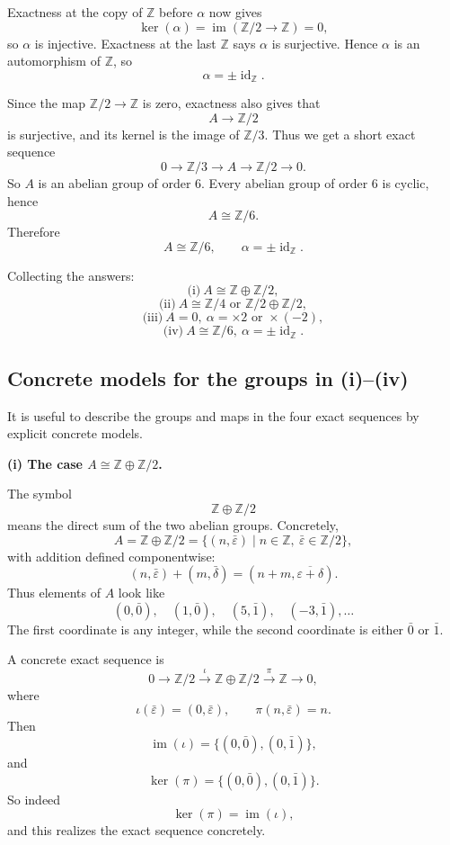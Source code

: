\documentclass[12pt,a4paper]{article}
\theoremstyle{notespace}
\begin{document}
Exactness at the copy of \(\mathbb Z\) before \(\alpha\) now gives
\[
\ker(\alpha)=\operatorname{im}(\mathbb Z/2 \to \mathbb Z)=0,
\]
so \(\alpha\) is injective. Exactness at the last \(\mathbb Z\) says \(\alpha\) is surjective. Hence \(\alpha\) is an automorphism of \(\mathbb Z\), so
\[
\alpha=\pm \operatorname{id}_{\mathbb Z}.
\]

Since the map \(\mathbb Z/2 \to \mathbb Z\) is zero, exactness also gives that
\[
A \longrightarrow \mathbb Z/2
\]
is surjective, and its kernel is the image of \(\mathbb Z/3\). Thus we get a short exact sequence
\[
0 \longrightarrow \mathbb Z/3 \longrightarrow A \longrightarrow \mathbb Z/2 \longrightarrow 0.
\]
So \(A\) is an abelian group of order \(6\). Every abelian group of order \(6\) is cyclic, hence
\[
A \cong \mathbb Z/6.
\]
Therefore
\[
\boxed{A \cong \mathbb Z/6,\qquad \alpha=\pm \operatorname{id}_{\mathbb Z}.}
\]

\medskip

Collecting the answers:
\[
\boxed{\text{(i)}\ A\cong \mathbb Z\oplus \mathbb Z/2,}
\]
\[
\boxed{\text{(ii)}\ A\cong \mathbb Z/4 \text{ or } \mathbb Z/2\oplus \mathbb Z/2,}
\]
\[
\boxed{\text{(iii)}\ A=0,\ \alpha=\times 2 \text{ or } \times(-2),}
\]
\[
\boxed{\text{(iv)}\ A\cong \mathbb Z/6,\ \alpha=\pm \operatorname{id}_{\mathbb Z}.}
\]

\subsection{Concrete models for the groups in (i)--(iv)}

It is useful to describe the groups and maps in the four exact sequences by explicit concrete models.

\medskip

\textbf{(i) The case \(A \cong \mathbb Z \oplus \mathbb Z/2\).}

The symbol
\[
\mathbb Z \oplus \mathbb Z/2
\]
means the direct sum of the two abelian groups. Concretely,
\[
A=\mathbb Z \oplus \mathbb Z/2
=\{(n,\bar\varepsilon)\mid n\in\mathbb Z,\ \bar\varepsilon\in\mathbb Z/2\},
\]
with addition defined componentwise:
\[
(n,\bar\varepsilon)+(m,\bar\delta)
=(n+m,\overline{\varepsilon+\delta}).
\]
Thus elements of \(A\) look like
\[
(0,\bar 0),\quad (1,\bar 0),\quad (5,\bar 1),\quad (-3,\bar 1),\dots
\]
The first coordinate is any integer, while the second coordinate is either \(\bar 0\) or \(\bar 1\).

A concrete exact sequence is
\[
0\longrightarrow \mathbb Z/2
\xrightarrow{\ \iota\ }
\mathbb Z\oplus \mathbb Z/2
\xrightarrow{\ \pi\ }
\mathbb Z
\longrightarrow 0,
\]
where
\[
\iota(\bar\varepsilon)=(0,\bar\varepsilon),
\qquad
\pi(n,\bar\varepsilon)=n.
\]
Then
\[
\operatorname{im}(\iota)=\{(0,\bar0),(0,\bar1)\},
\]
and
\[
\ker(\pi)=\{(0,\bar0),(0,\bar1)\}.
\]
So indeed
\[
\ker(\pi)=\operatorname{im}(\iota),
\]
and this realizes the exact sequence concretely.
\end{document}

